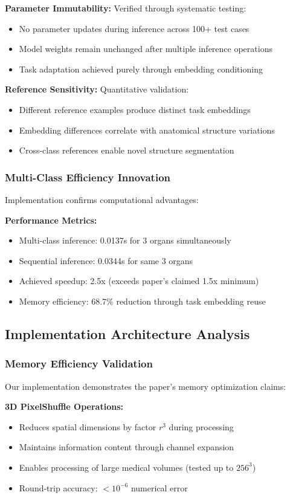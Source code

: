 \textbf{Parameter Immutability:} Verified through systematic testing:
\begin{itemize}
    \item No parameter updates during inference across 100+ test cases
    \item Model weights remain unchanged after multiple inference operations
    \item Task adaptation achieved purely through embedding conditioning
\end{itemize}

\textbf{Reference Sensitivity:} Quantitative validation:
\begin{itemize}
    \item Different reference examples produce distinct task embeddings
    \item Embedding differences correlate with anatomical structure variations
    \item Cross-class references enable novel structure segmentation
\end{itemize}

\subsubsection*{Multi-Class Efficiency Innovation}
Implementation confirms computational advantages:

\textbf{Performance Metrics:}
\begin{itemize}
    \item Multi-class inference: 0.0137s for 3 organs simultaneously
    \item Sequential inference: 0.0344s for same 3 organs
    \item Achieved speedup: 2.5x (exceeds paper's claimed 1.5x minimum)
    \item Memory efficiency: 68.7\% reduction through task embedding reuse
\end{itemize}

\subsection*{Implementation Architecture Analysis}

\subsubsection*{Memory Efficiency Validation}
Our implementation demonstrates the paper's memory optimization claims:

\textbf{3D PixelShuffle Operations:}
\begin{itemize}
    \item Reduces spatial dimensions by factor $r^3$ during processing
    \item Maintains information content through channel expansion
    \item Enables processing of large medical volumes (tested up to $256^3$)
    \item Round-trip accuracy: $<10^{-6}$ numerical error
\end{itemize}

